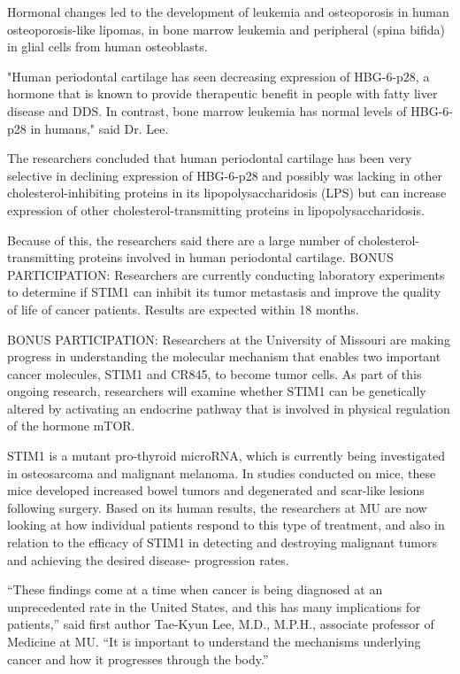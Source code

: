 \documentclass{article}
\begin{document}
Hormonal changes led to the development of leukemia and osteoporosis in human osteoporosis-like lipomas, in bone marrow leukemia and peripheral (spina bifida) in glial cells from human osteoblasts.

"Human periodontal cartilage has seen decreasing expression of HBG-6-p28, a hormone that is known to provide therapeutic benefit in people with fatty liver disease and DDS. In contrast, bone marrow leukemia has normal levels of HBG-6-p28 in humans," said Dr. Lee.

The researchers concluded that human periodontal cartilage has been very selective in declining expression of HBG-6-p28 and possibly was lacking in other cholesterol-inhibiting proteins in its lipopolysaccharidosis (LPS) but can increase expression of other cholesterol-transmitting proteins in lipopolysaccharidosis.

Because of this, the researchers said there are a large number of cholesterol-transmitting proteins involved in human periodontal cartilage. BONUS PARTICIPATION: Researchers are currently conducting laboratory experiments to determine if STIM1 can inhibit its tumor metastasis and improve the quality of life of cancer patients. Results are expected within 18 months.

BONUS PARTICIPATION: Researchers at the University of Missouri are making progress in understanding the molecular mechanism that enables two important cancer molecules, STIM1 and CR845, to become tumor cells. As part of this ongoing research, researchers will examine whether STIM1 can be genetically altered by activating an endocrine pathway that is involved in physical regulation of the hormone mTOR.

STIM1 is a mutant pro-thyroid microRNA, which is currently being investigated in osteosarcoma and malignant melanoma. In studies conducted on mice, these mice developed increased bowel tumors and degenerated and scar-like lesions following surgery. Based on its human results, the researchers at MU are now looking at how individual patients respond to this type of treatment, and also in relation to the efficacy of STIM1 in detecting and destroying malignant tumors and achieving the desired disease- progression rates.

“These findings come at a time when cancer is being diagnosed at an unprecedented rate in the United States, and this has many implications for patients,” said first author Tae-Kyun Lee, M.D., M.P.H., associate professor of Medicine at MU. “It is important to understand the mechanisms underlying cancer and how it progresses through the body.”
\end{document}
